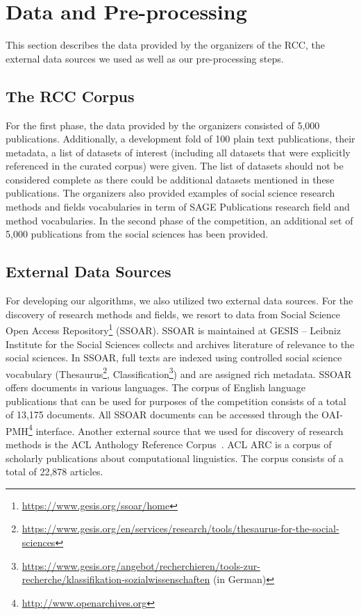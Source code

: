 \section{Data and Pre-processing}
This section describes the data provided by the organizers of the RCC, the external data sources we used as well as our pre-processing steps.
\subsection{The RCC Corpus}
\label{subsec:rcc-corpus}
For the first phase, the data provided by the organizers consisted of 5,000 publications. Additionally, a development fold of 100 plain text publications, their metadata, a list of datasets of interest (including all datasets that were explicitly referenced in the curated corpus) were given. The list of datasets should not be considered complete as  there could be additional datasets mentioned in these publications. 
The organizers also provided examples of social science research methods and fields vocabularies in term of SAGE Publications research field and method vocabularies. 
In the second phase of the competition, an additional set of 5,000 publications from the social sciences has been provided.
\subsection{External Data Sources}
For developing our algorithms, we also utilized two external data sources. For the discovery of research methods and fields, we resort to data from Social Science Open Access Repository\footnote{\url{https://www.gesis.org/ssoar/home}} (SSOAR). 
SSOAR is maintained at GESIS – Leibniz Institute for the Social Sciences collects and archives literature of relevance to the social sciences. In SSOAR, full texts are indexed using controlled social science vocabulary (Thesaurus\footnote{\url{https://www.gesis.org/en/services/research/tools/thesaurus-for-the-social-sciences}}, Classification\footnote{\url{https://www.gesis.org/angebot/recherchieren/tools-zur-recherche/klassifikation-sozialwissenschaften} (in German)}) and are assigned rich metadata. SSOAR offers documents in various languages. The corpus of English language publications that can be used for purposes of the competition consists of a total of 13,175 documents. All SSOAR documents can be accessed through the OAI-PMH\footnote{{\url{http://www.openarchives.org}}} interface. 
Another external source that we used for discovery of research methods is the ACL Anthology Reference Corpus~\cite{bird2008acl}. ACL ARC is a corpus of scholarly publications about computational linguistics.  
The corpus consists of a total of 22,878 articles.


